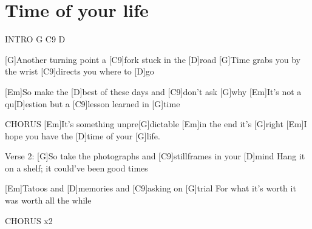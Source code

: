 \section{Time of your life}
\begin{guitar}
\begin{multicols}{2}
INTRO G C9 D

[G]Another turning point a [C9]fork stuck in the [D]road
[G]Time grabs you by the wrist [C9]directs you where to [D]go

[Em]So make the [D]best of these days and [C9]don't ask [G]why
[Em]It's not a qu[D]estion but a [C9]lesson learned in [G]time


CHORUS
[Em]It's something unpre[G]dictable [Em]in the end it's [G]right
[Em]I hope you have the [D]time of your [G]life.

Verse 2:
[G]So take the photographs and [C9]stillframes in your [D]mind
Hang it on a shelf; it could've been good times

[Em]Tatoos and [D]memories and [C9]asking on [G]trial
For what it's worth it was worth all the while


CHORUS x2
\end{multicols}
\end{guitar}
